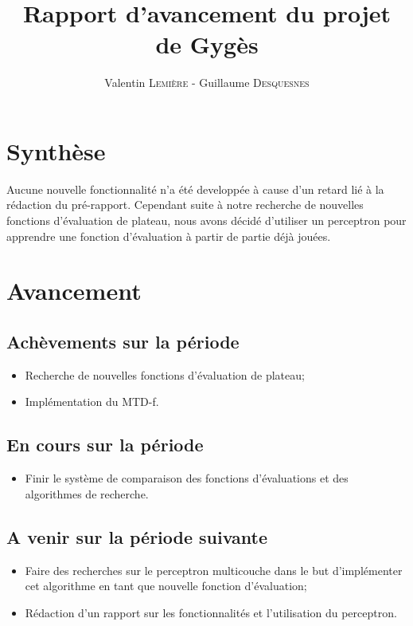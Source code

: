 \documentclass[a4paper]{article}
\title{Rapport d'avancement \no 3 du projet de Gygès}
\author{Valentin \textsc{Lemière} - Guillaume \textsc{Desquesnes}}
\date{}
\begin{document}
\maketitle

\section*{Synthèse}
	Aucune nouvelle fonctionnalité n'a été developpée à cause d'un retard lié à la rédaction du pré-rapport.
	Cependant suite à notre recherche de nouvelles fonctions d'évaluation de plateau,
	nous avons décidé d'utiliser un perceptron pour apprendre une fonction d'évaluation à partir de partie déjà jouées.

\section*{Avancement}
	\subsection*{Achèvements sur la période}
		\begin{itemize}
			\item Recherche de nouvelles fonctions d'évaluation de plateau;
			\item Implémentation du MTD-f.
		\end{itemize}

	\subsection*{En cours sur la période}
		\begin{itemize}
			\item Finir le système de comparaison des fonctions d'évaluations et des
				algorithmes de recherche.
		\end{itemize}

	\subsection*{A venir sur la période suivante}
		\begin{itemize}
			\item Faire des recherches sur le perceptron multicouche dans le but
				d'implémenter cet algorithme en tant que nouvelle fonction d'évaluation;
			\item Rédaction d'un rapport sur les fonctionnalités et l'utilisation du
			perceptron.
		\end{itemize}
\end{document}
